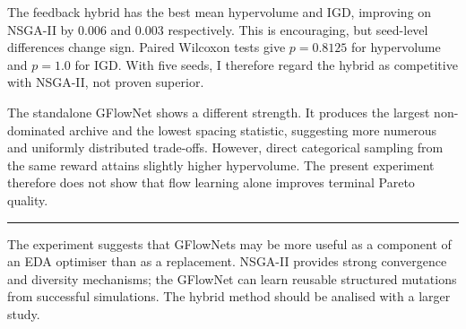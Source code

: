 \documentclass[10pt,a4paper]{article}
\newcommand{\rsection}[1]{\vspace{4pt}{\large\bfseries\textcolor{accent}{#1}}\par\vspace{-2pt}\textcolor{muted}{\rule{\textwidth}{0.5pt}}}
\begin{document}
The feedback hybrid has the best mean hypervolume and IGD, improving on NSGA-II by 0.006 and 0.003 respectively. This is encouraging, but seed-level differences change sign. Paired Wilcoxon tests give $p=0.8125$ for hypervolume and $p=1.0$ for IGD. With five seeds, I therefore regard the hybrid as competitive with NSGA-II, not proven superior.

The standalone GFlowNet shows a different strength. It produces the largest non-dominated archive and the lowest spacing statistic, suggesting more numerous and uniformly distributed trade-offs. However, direct categorical sampling from the same reward attains slightly higher hypervolume. The present experiment therefore does not show that flow learning alone improves terminal Pareto quality.

\rsection{What I learned and next steps}

The experiment suggests that GFlowNets may be more useful as a component of an EDA optimiser than as a replacement. NSGA-II provides strong convergence and diversity mechanisms; the GFlowNet can learn reusable structured mutations from successful simulations. The hybrid method should be analised with a larger study.





\end{document}
